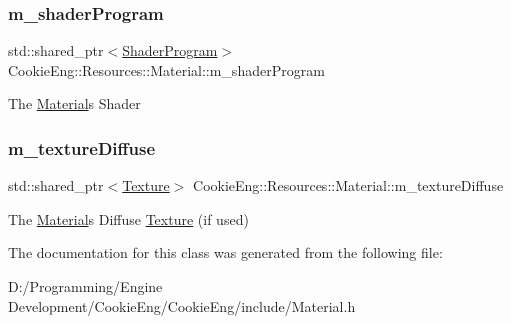 \subsubsection{\texorpdfstring{m\+\_\+shader\+Program}{m\_shaderProgram}}
{\footnotesize\ttfamily std\+::shared\+\_\+ptr$<$\hyperlink{class_cookie_eng_1_1_resources_1_1_shader_program}{Shader\+Program}$>$ Cookie\+Eng\+::\+Resources\+::\+Material\+::m\+\_\+shader\+Program\hspace{0.3cm}{\ttfamily [protected]}}

The \hyperlink{class_cookie_eng_1_1_resources_1_1_material}{Material}\textquotesingle{}s Shader \mbox{\label{class_cookie_eng_1_1_resources_1_1_material_adf7fcbb59dcfbad47d48052522414791}} 
\subsubsection{\texorpdfstring{m\+\_\+texture\+Diffuse}{m\_textureDiffuse}}
{\footnotesize\ttfamily std\+::shared\+\_\+ptr$<$\hyperlink{class_cookie_eng_1_1_resources_1_1_texture}{Texture}$>$ Cookie\+Eng\+::\+Resources\+::\+Material\+::m\+\_\+texture\+Diffuse\hspace{0.3cm}{\ttfamily [protected]}}

The \hyperlink{class_cookie_eng_1_1_resources_1_1_material}{Material}\textquotesingle{}s Diffuse \hyperlink{class_cookie_eng_1_1_resources_1_1_texture}{Texture} (if used) 

The documentation for this class was generated from the following file\+:\begin{DoxyCompactItemize}
\item 
D\+:/\+Programming/\+Engine Development/\+Cookie\+Eng/\+Cookie\+Eng/include/Material.\+h\end{DoxyCompactItemize}
